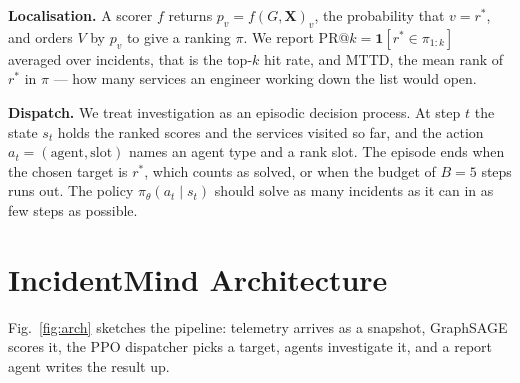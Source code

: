 \documentclass[conference,a4paper]{IEEEtran}
\begin{document}
\textbf{Localisation.} A scorer $f$ returns $p_v=f(G,\mathbf{X})_v$, the probability that $v=r^*$, and orders $V$ by $p_v$ to give a ranking $\pi$. We report PR@$k=\mathbf{1}[r^*\in\pi_{1:k}]$ averaged over incidents, that is the top-$k$ hit rate, and MTTD, the mean rank of $r^*$ in $\pi$ --- how many services an engineer working down the list would open.

\textbf{Dispatch.} We treat investigation as an episodic decision process. At step $t$ the state $s_t$ holds the ranked scores and the services visited so far, and the action $a_t=(\text{agent},\text{slot})$ names an agent type and a rank slot. The episode ends when the chosen target is $r^*$, which counts as solved, or when the budget of $B=5$ steps runs out. The policy $\pi_\theta(a_t\mid s_t)$ should solve as many incidents as it can in as few steps as possible.

\section{IncidentMind Architecture}
Fig.~\ref{fig:arch} sketches the pipeline: telemetry arrives as a snapshot, GraphSAGE scores it, the PPO dispatcher picks a target, agents investigate it, and a report agent writes the result up.
\end{document}
